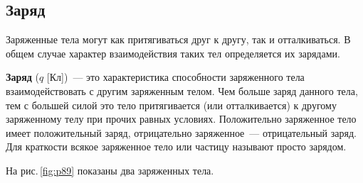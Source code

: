 \documentclass[main.tex]{subfiles}
\begin{document}

\pagestyle{empty}

\begin{NoHyper} %

\setcounter{section}{2
}
\addtocounter{section}{-1} 

\section{Заряд}


Заряженные тела могут как притягиваться друг к другу, так и отталкиваться. В общем случае характер взаимодействия таких тел определяется их зарядами.

\textbf{Заряд} ($q$ [Кл])~--- это характеристика способности заряженного тела взаимодействовать с другим заряженным телом. Чем больше заряд данного тела, тем с большей силой это тело притягивается (или отталкивается) к другому заряженному телу при прочих равных условиях. Положительно заряженное тело имеет положительный заряд, отрицательно заряженное~--- отрицательный заряд. Для краткости всякое заряженное тело или частицу называют просто зарядом.

На рис.\,\ref{fig:p89} показаны два заряженных тела.

    \begin{figure}[H]
    \centering

\end{figure}
\end{NoHyper}
\end{document}
